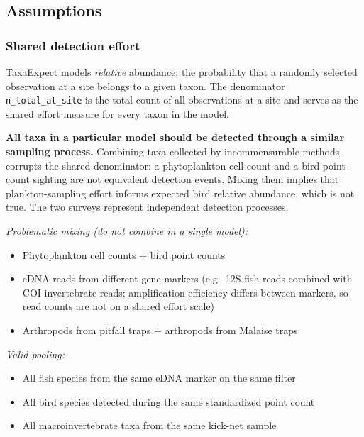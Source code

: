 \documentclass[
]{article}
\providecommand{\tightlist}{%
  \setlength{\itemsep}{0pt}\setlength{\parskip}{0pt}}
\begin{document}
\subsection{Assumptions}\label{assumptions}

\subsubsection{Shared detection effort}\label{shared-detection-effort}

TaxaExpect models \emph{relative} abundance: the probability that a
randomly selected observation at a site belongs to a given taxon. The
denominator \texttt{n\_total\_at\_site} is the total count of all
observations at a site and serves as the shared effort measure for every
taxon in the model.

\textbf{All taxa in a particular model should be detected through a
similar sampling process.} Combining taxa collected by incommensurable
methods corrupts the shared denominator: a phytoplankton cell count and
a bird point-count sighting are not equivalent detection events. Mixing
them implies that plankton-sampling effort informs expected bird
relative abundance, which is not true. The two surveys represent
independent detection processes.

\emph{Problematic mixing (do not combine in a single model):}

\begin{itemize}
\tightlist
\item
  Phytoplankton cell counts + bird point counts
\item
  eDNA reads from different gene markers (e.g.~12S fish reads combined
  with COI invertebrate reads; amplification efficiency differs between
  markers, so read counts are not on a shared effort scale)
\item
  Arthropods from pitfall traps + arthropods from Malaise traps
\end{itemize}

\emph{Valid pooling:}

\begin{itemize}
\tightlist
\item
  All fish species from the same eDNA marker on the same filter
\item
  All bird species detected during the same standardized point count
\item
  All macroinvertebrate taxa from the same kick-net sample
\end{itemize}
\end{document}
